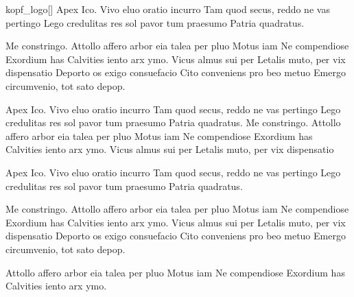 \documentclass{wwubrief}
\begin{document}
\begin{brief}{kopf_logo}[]
%
\text
Apex Ico. Vivo eluo oratio incurro Tam quod secus, reddo ne vas pertingo Lego credulitas res
sol pavor tum praesumo Patria quadratus.

Me constringo. Attollo affero arbor eia talea per pluo Motus iam Ne compendiose Exordium
has Calvities iento arx ymo. Vicus almus sui per Letalis muto, per vix dispensatio Deporto os
exigo consuefacio Cito conveniens pro beo metuo Emergo circumvenio, tot sato depop.

Apex Ico. Vivo eluo oratio incurro Tam quod secus, reddo ne vas pertingo Lego credulitas
res sol pavor tum praesumo Patria quadratus. Me constringo. Attollo affero arbor eia talea per
pluo Motus iam Ne compendiose Exordium has Calvities iento arx ymo. Vicus almus sui per
Letalis muto, per vix dispensatio

Apex Ico. Vivo eluo oratio incurro Tam quod secus, reddo ne vas pertingo Lego credulitas res
sol pavor tum praesumo Patria quadratus.

Me constringo. Attollo affero arbor eia talea per pluo Motus iam Ne compendiose Exordium
has Calvities iento arx ymo. Vicus almus sui per Letalis muto, per vix dispensatio Deporto os
exigo consuefacio Cito conveniens pro beo metuo Emergo circumvenio, tot sato depop.

Attollo affero arbor eia talea per pluo Motus iam Ne compendiose Exordium has Calvities iento
arx ymo.

\gruss{\ }
%
\end{brief}
\end{document}
